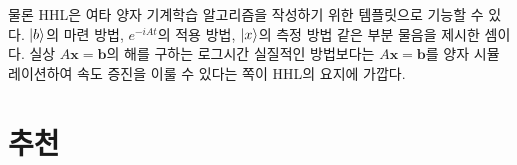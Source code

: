 \documentclass[a4paper,atbegshi,chapter,itemph,hidelinks]{oblivoir}
\begin{document}
물론 HHL은 여타 양자 기계학습 알고리즘을 작성하기 위한 템플릿으로 기능할 수 있다.
$\ket{b}$의 마련 방법, $e^{-iAt}$의 적용 방법, $\ket{x}$의 측정 방법 같은 부분
물음을 제시한 셈이다. 실상 $A\pmb{x}=\pmb{b}$의 해를 구하는 로그시간 실질적인
방법보다는 $A\pmb{x}= \pmb{b}$를 양자 시뮬레이션하여 속도 증진을 이룰 수 있다는
쪽이 HHL의 요지에 가깝다. 
\chapter{추천}
\end{document}
